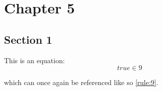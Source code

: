 \chapter{Chapter 5}\label{ch:ch5}

\section{Section 1}

This is an equation:
\begin{equation}
	true \in 9
\label{rule:9}
\end{equation}

which can once again be referenced like so \ref{rule:9}.
